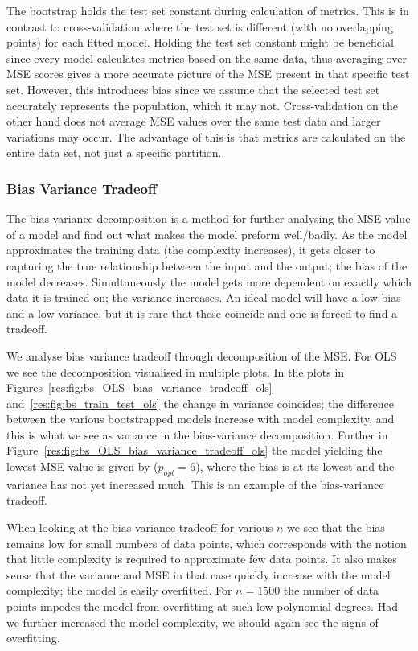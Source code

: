 \documentclass[twocolumn,english,notitlepage]{article}
\begin{document}
            The bootstrap holds the test set constant during calculation of metrics. This is in contrast to cross-validation where the test set is different (with no overlapping points) for each fitted model. Holding the test set constant might be beneficial since every model calculates metrics based on the same data, thus averaging over MSE scores gives a more accurate picture of the MSE present in that specific test set. However, this introduces bias since we assume that the selected test set accurately represents the population, which it may not. Cross-validation on the other hand does not average MSE values over the same test data and larger variations may occur. The advantage of this is that metrics are calculated on the entire data set, not just a specific partition.



        \subsubsection{Bias Variance Tradeoff}
            The bias-variance decomposition is a method for further analysing the MSE value of a model and find out what makes the model preform well/badly. As the model approximates the training data (the complexity increases), it gets closer to capturing the true relationship between the input and the output; the bias of the model decreases. Simultaneously the model gets more dependent on exactly which data it is trained on; the variance increases. An ideal model will have a low bias and a low variance, but it is rare that these coincide and one is forced to find a tradeoff. 

            We analyse bias variance tradeoff through decomposition of the MSE. For OLS we see the decomposition visualised in multiple plots. In the plots in Figures~\ref{res:fig:bs_OLS_bias_variance_tradeoff_ols} and~\ref{res:fig:bs_train_test_ols} the change in variance coincides; the difference between the various bootstrapped models increase with model complexity, and this is what we see as variance in the bias-variance decomposition. Further in Figure~\ref{res:fig:bs_OLS_bias_variance_tradeoff_ols} the model yielding the lowest MSE value is given by ($p_{opt}=6$), where the bias is at its lowest and the variance has not yet increased much. This is an example of the bias-variance tradeoff.  

            When looking at the bias variance tradeoff for various $n$ we see that the bias remains low for small numbers of data points, which corresponds with the notion that little complexity is required to approximate few data points. It also makes sense that the variance and MSE in that case quickly increase with the model complexity; the model is easily overfitted. For $n=1500$ the number of data points impedes the model from overfitting at such low polynomial degrees. Had we further increased the model complexity, we should again see the signs of overfitting. 
\end{document}
